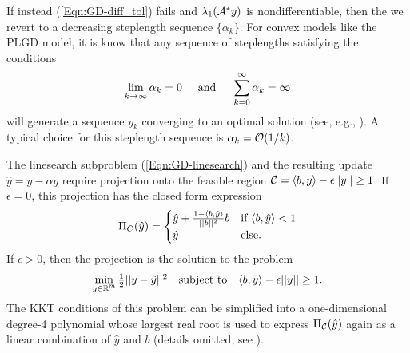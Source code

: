 If instead (\ref{Eqn:GD-diff_tol}) fails and $\lambda_1({\mathcal A}^* y)$ is nondifferentiable, then the we revert to a decreasing steplength sequence $\{ \alpha_k \}$.  For convex models like the PLGD model, it is know that any sequence of steplengths satisfying the conditions
\begin{equation} 		\label{Eqn:GD-steplength_sum}
	\lim\limits_{\substack{k \rightarrow \infty}} \alpha_k = 0
	\hspace{.5cm} \textnormal{and} \hspace{.5cm}
	\sum\limits_{\substack{k = 0}}^{\substack{\infty}} \alpha_k = \infty
\end{equation}
will generate a sequence $y_k$ converging to an optimal solution (see, e.g., \cite[Proposition 1.2.3 and Section 3.3.1]{bertsekas2016nonlinear}).  A typical choice for this steplength sequence is $\alpha_k = {\mathcal O}(1/k)$.





The linesearch subproblem (\ref{Eqn:GD-linesearch}) and the resulting update $\hat{y} = y - \alpha g$ require projection onto the feasible region ${\mathcal C}= \langle b, y \rangle - \epsilon ||y|| \geq 1$.   If $\epsilon = 0$, this projection has the closed form expression
\begin{equation} 	\label{Eqn:GD-projection}
\Pi_C(\hat{y}) =
	\begin{cases}
		\hat{y} + \frac{1 - \langle b, \hat{y} \rangle}{||b||^2}b 	&	\textnormal{if} \ \langle b, \hat{y} \rangle < 1		\\
		\hat{y}													& \textnormal{else}.
	\end{cases}
\end{equation}
If $\epsilon > 0$, then the projection is the solution to the problem
\begin{equation}		\label{Eqn:GD-projection_2}
\begin{array}{lcr}
\min\limits_{\substack{ y \in \mathbb{R}^m}} \frac{1}{2} || y - \hat{y} ||^2
	&	\textnormal{subject to} 	&	 \langle b, y \rangle - \epsilon ||y|| \geq 1.
\end{array}
\end{equation}
The KKT conditions of this problem can be simplified into a one-dimensional degree-4 polynomial whose largest real root is used to express $\Pi_{\mathcal C}(\hat{y})$ again as a linear combination of $\hat{y}$ and $b$ (details omitted, see \cite[Chapter 5]{boyd2004convex}).







